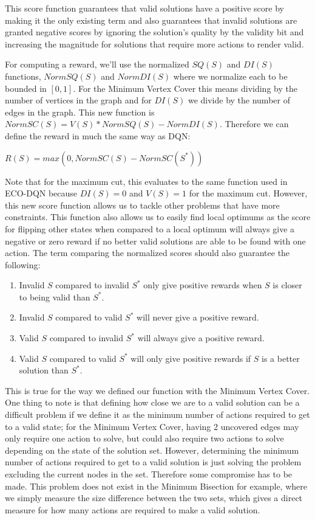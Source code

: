 \documentclass{article}
\begin{document}
This score function guarantees that valid solutions have a positive score by making it the only existing term and also guarantees that invalid solutions are granted negative scores by ignoring the solution's quality by the validity bit and increasing the magnitude for solutions that require more actions to render valid. 

For computing a reward, we'll use the normalized $SQ(S)$ and $DI(S)$ functions, $NormSQ(S)$ and $NormDI(S)$ where we normalize each to be bounded in $[0, 1]$. For the Minimum Vertex Cover this means dividing by the number of vertices in the graph and for $DI(S)$ we divide by the number of edges in the graph. This new function is $NormSC(S) = V(S) * NormSQ(S) - NormDI(S)$. Therefore we can define the reward in much the same way as DQN:

$R(S) = max(0, NormSC(S) - NormSC(S^*))$

Note that for the maximum cut, this evaluates to the same function used in ECO-DQN because $DI(S) = 0$ and $V(S) = 1$ for the maximum cut. However, this new score function allows us to tackle other problems that have more constraints. This function also allows us to easily find local optimums as the score for flipping other states when compared to a local optimum will always give a negative or zero reward if no better valid solutions are able to be found with one action. The term comparing the normalized scores should also guarantee the following:

\begin{enumerate}
    \item Invalid $S$ compared to invalid $S^*$ only give positive rewards when $S$ is closer to being valid than $S^*$. 
    \item Invalid $S$ compared to valid $S^*$ will never give a positive reward. 
    \item Valid $S$ compared to invalid $S^*$ will always give a positive reward. 
    \item Valid $S$ compared to valid $S^*$ will only give positive rewards if $S$ is a better solution than $S^*$. 
\end{enumerate}

This is true for the way we defined our function with the Minimum Vertex Cover. One thing to note is that defining how close we are to a valid solution can be a difficult problem if we define it as the minimum number of actions required to get to a valid state; for the Minimum Vertex Cover, having 2 uncovered edges may only require one action to solve, but could also require two actions to solve depending on the state of the solution set. However, determining the minimum number of actions required to get to a valid solution is just solving the problem excluding the current nodes in the set. Therefore some compromise has to be made. This problem does not exist in the Minimum Bisection for example, where we simply measure the size difference between the two sets, which gives a direct measure for how many actions are required to make a valid solution.
\end{document}
